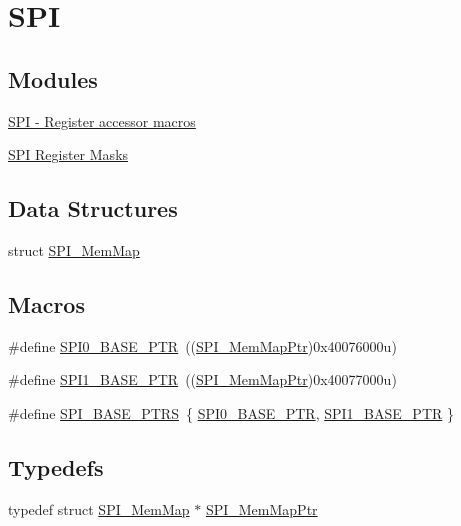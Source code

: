 \hypertarget{group___s_p_i___peripheral}{}\section{S\+PI}
\label{group___s_p_i___peripheral}
\subsection*{Modules}
\begin{DoxyCompactItemize}
\item 
\hyperlink{group___s_p_i___register___accessor___macros}{S\+P\+I -\/ Register accessor macros}
\item 
\hyperlink{group___s_p_i___register___masks}{S\+P\+I Register Masks}
\end{DoxyCompactItemize}
\subsection*{Data Structures}
\begin{DoxyCompactItemize}
\item 
struct \hyperlink{struct_s_p_i___mem_map}{S\+P\+I\+\_\+\+Mem\+Map}
\end{DoxyCompactItemize}
\subsection*{Macros}
\begin{DoxyCompactItemize}
\item 
\#define \hyperlink{group___s_p_i___peripheral_ga851f64a97b5919c1f99a34db5918b3b4}{S\+P\+I0\+\_\+\+B\+A\+S\+E\+\_\+\+P\+TR}~((\hyperlink{group___s_p_i___peripheral_ga7e4e9921e4d56bdbb10a04e77743ff5e}{S\+P\+I\+\_\+\+Mem\+Map\+Ptr})0x40076000u)
\item 
\#define \hyperlink{group___s_p_i___peripheral_gae28fd789e0602a32076c1c13ca39f5af}{S\+P\+I1\+\_\+\+B\+A\+S\+E\+\_\+\+P\+TR}~((\hyperlink{group___s_p_i___peripheral_ga7e4e9921e4d56bdbb10a04e77743ff5e}{S\+P\+I\+\_\+\+Mem\+Map\+Ptr})0x40077000u)
\item 
\#define \hyperlink{group___s_p_i___peripheral_ga3a16fecfe27c2052ab60e014be3f66f6}{S\+P\+I\+\_\+\+B\+A\+S\+E\+\_\+\+P\+T\+RS}~\{ \hyperlink{group___s_p_i___peripheral_ga851f64a97b5919c1f99a34db5918b3b4}{S\+P\+I0\+\_\+\+B\+A\+S\+E\+\_\+\+P\+TR}, \hyperlink{group___s_p_i___peripheral_gae28fd789e0602a32076c1c13ca39f5af}{S\+P\+I1\+\_\+\+B\+A\+S\+E\+\_\+\+P\+TR} \}
\end{DoxyCompactItemize}
\subsection*{Typedefs}
\begin{DoxyCompactItemize}
\item 
typedef struct \hyperlink{struct_s_p_i___mem_map}{S\+P\+I\+\_\+\+Mem\+Map} $\ast$ \hyperlink{group___s_p_i___peripheral_ga7e4e9921e4d56bdbb10a04e77743ff5e}{S\+P\+I\+\_\+\+Mem\+Map\+Ptr}
\end{DoxyCompactItemize}


